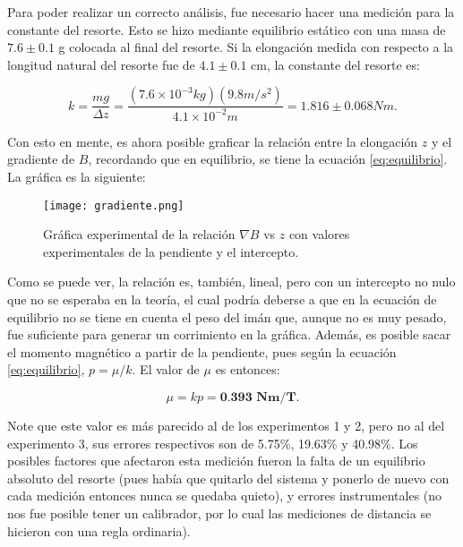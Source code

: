 \documentclass[%
 reprint,
 amsmath,amssymb,
 aps,
]{revtex4-1}
\begin{document}
Para poder realizar un correcto análisis, fue necesario hacer una medición para la constante del resorte. Esto se hizo mediante equilibrio estático con una masa de $7.6 \pm 0.1$ g colocada al final del resorte. Si la elongación medida con respecto a la longitud natural del resorte fue de $4.1 \pm 0.1$ cm, la constante del resorte es:

\begin{equation}
    k = \frac{mg}{\Delta z}=\frac{(7.6\times10^{-3}kg)(9.8m/s^2)}{4.1\times10^{-2}m}=1.816 \pm 0.068 Nm.
    \label{eq:k}
\end{equation}

Con esto en mente, es ahora posible graficar la relación entre la elongación $z$ y el gradiente de $B$, recordando que en equilibrio, se tiene la ecuación \ref{eq:equilibrio}. La gráfica es la siguiente:

\begin{figure}[H]
    \centering
    \texttt{[image: gradiente.png]}
    \caption{Gráfica experimental de la relación $\nabla B$ vs $z$ con valores experimentales de la pendiente y el intercepto.}
    \label{fig:grafica5}
\end{figure}

Como se puede ver, la relación es, también, lineal, pero con un intercepto no nulo que no se esperaba en la teoría, el cual podría deberse a que en la ecuación de equilibrio no se tiene en cuenta el peso del imán que, aunque no es muy pesado, fue suficiente para generar un corrimiento en la gráfica. Además, es posible sacar el momento magnético a partir de la pendiente, pues según la ecuación \ref{eq:equilibrio}, $p = \mu /k$. El valor de $\mu$ es entonces:

\begin{equation*}
    \mu = kp = \textbf{0.393 Nm/T}.
\end{equation*}

Note que este valor es más parecido al de los experimentos 1 y 2, pero no al del experimento 3, sus errores respectivos son de 5.75\%, 19.63\% y 40.98\%. Los posibles factores que afectaron esta medición fueron la falta de un equilibrio absoluto del resorte (pues había que quitarlo del sistema y ponerlo de nuevo con cada medición entonces nunca se quedaba quieto), y errores instrumentales (no nos fue posible tener un calibrador, por lo cual las mediciones de distancia se hicieron con una regla ordinaria).
\end{document}
